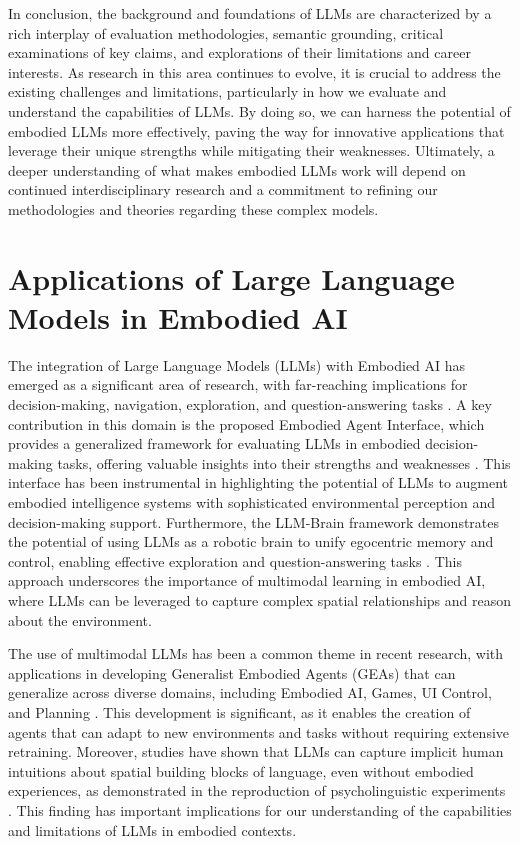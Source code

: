\documentclass[conference]{IEEEtran}
\begin{document}
In conclusion, the background and foundations of LLMs are characterized by a rich interplay of evaluation methodologies, semantic grounding, critical examinations of key claims, and explorations of their limitations and career interests. As research in this area continues to evolve, it is crucial to address the existing challenges and limitations, particularly in how we evaluate and understand the capabilities of LLMs. By doing so, we can harness the potential of embodied LLMs more effectively, paving the way for innovative applications that leverage their unique strengths while mitigating their weaknesses. Ultimately, a deeper understanding of what makes embodied LLMs work will depend on continued interdisciplinary research and a commitment to refining our methodologies and theories regarding these complex models.

\section{Applications of Large Language Models in Embodied AI}
The integration of Large Language Models (LLMs) with Embodied AI has emerged as a significant area of research, with far-reaching implications for decision-making, navigation, exploration, and question-answering tasks \cite{b1}. A key contribution in this domain is the proposed Embodied Agent Interface, which provides a generalized framework for evaluating LLMs in embodied decision-making tasks, offering valuable insights into their strengths and weaknesses \cite{b1}. This interface has been instrumental in highlighting the potential of LLMs to augment embodied intelligence systems with sophisticated environmental perception and decision-making support. Furthermore, the LLM-Brain framework demonstrates the potential of using LLMs as a robotic brain to unify egocentric memory and control, enabling effective exploration and question-answering tasks \cite{b2}. This approach underscores the importance of multimodal learning in embodied AI, where LLMs can be leveraged to capture complex spatial relationships and reason about the environment.

The use of multimodal LLMs has been a common theme in recent research, with applications in developing Generalist Embodied Agents (GEAs) that can generalize across diverse domains, including Embodied AI, Games, UI Control, and Planning \cite{b4}. This development is significant, as it enables the creation of agents that can adapt to new environments and tasks without requiring extensive retraining. Moreover, studies have shown that LLMs can capture implicit human intuitions about spatial building blocks of language, even without embodied experiences, as demonstrated in the reproduction of psycholinguistic experiments \cite{b3}. This finding has important implications for our understanding of the capabilities and limitations of LLMs in embodied contexts.
\end{document}
